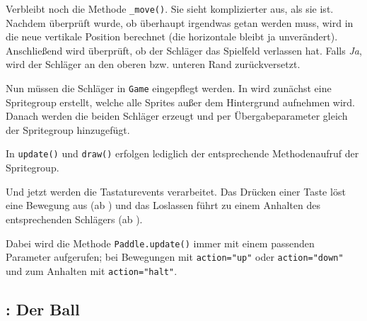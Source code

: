 
Verbleibt noch die Methode \texttt{\_move()}. Sie sieht komplizierter aus, als sie ist. Nachdem überprüft wurde, ob überhaupt irgendwas getan werden muss, wird in  die neue vertikale Position berechnet (die horizontale bleibt ja unverändert). Anschließend wird überprüft, ob der Schläger das Spielfeld verlassen hat. Falls \emph{Ja}, wird der Schläger an den oberen bzw. unteren Rand zurückversetzt.


Nun müssen die Schläger in \texttt{Game} eingepflegt werden. In  wird zunächst eine Spritegroup erstellt, welche alle Sprites außer dem Hintergrund aufnehmen wird. Danach werden die beiden Schläger erzeugt und per Übergabeparameter gleich der Spritegroup hinzugefügt.


In \texttt{update()} und \texttt{draw()} erfolgen lediglich der entsprechende Methodenaufruf der Spritegroup.


Und jetzt werden die Tastaturevents verarbeitet. Das Drücken einer Taste löst eine Bewegung aus (ab ) und das Loslassen führt zu einem Anhalten des entsprechenden Schlägers (ab ). 

Dabei wird die Methode \texttt{Paddle.update()} immer mit einem passenden Parameter aufgerufen; bei Bewegungen mit \verb+action="up"+ oder \verb+action="down"+ und zum Anhalten mit \verb+action="halt"+.



\subsection{: Der Ball}

